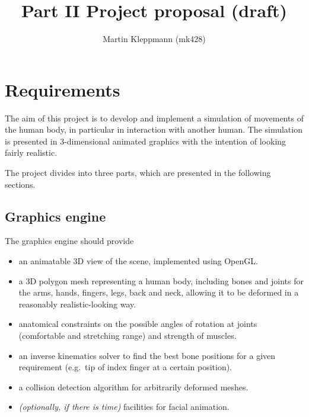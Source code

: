 \documentclass{article}
\begin{document}
\title{Part II Project proposal (draft)}
\author{Martin Kleppmann (mk428)}
\maketitle

\section{Requirements}
The aim of this project is to develop and implement a simulation of movements
of the human body, in particular in interaction with another human. The
simulation is presented in 3-dimensional animated graphics with the intention
of looking fairly realistic.

The project divides into three parts, which are presented in the following
sections.

\subsection{Graphics engine}
The graphics engine should provide
\begin{itemize}
	\item an animatable 3D view of the scene, implemented using OpenGL.
	\item a 3D polygon mesh representing a human body, including bones and joints
        for the arms, hands, fingers, legs, back and neck, allowing it to be 
        deformed in a reasonably realistic-looking way.
  \item anatomical constraints on the possible angles of rotation at joints
        (comfortable and stretching range) and strength of muscles.
  \item an inverse kinematics solver to find the best bone positions for a
  		  given requirement (e.g.\ tip of index finger at a certain position).
  \item a collision detection algorithm for arbitrarily deformed meshes.
  \item {\em (optionally, if there is time)\/} facilities for facial animation.
\end{itemize}
\end{document}
